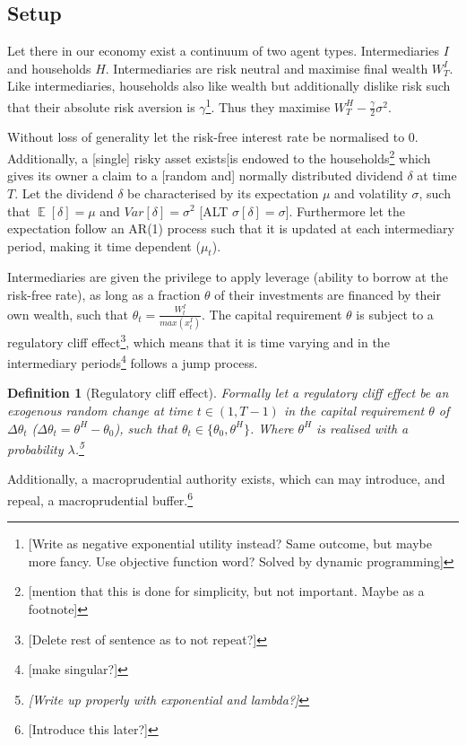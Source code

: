 \documentclass[11pt]{article}
\DeclareMathOperator{\E}{\mathbb{E}} %
\newtheorem{definition}{Definition}%
\begin{document}
\subsection*{Setup}

Let there in our economy exist a continuum of two agent types. Intermediaries $I$ and households $H$. Intermediaries are risk neutral and maximise final wealth $W^I_T$. Like intermediaries, households also like wealth but additionally dislike risk such that their absolute risk aversion is $\gamma$\footnote{[Write as negative exponential utility instead? Same outcome, but maybe more fancy. Use objective function word? Solved by dynamic programming]}. Thus they maximise $W^H_T - \frac{\gamma}{2}\sigma^2$.

Without loss of generality let the risk-free interest rate be normalised to 0. Additionally, a [single] risky asset exists[is endowed to the households\footnote{[mention that this is done for simplicity, but not important. Maybe as a footnote]} which gives its owner a claim to a [random and] normally distributed dividend $\delta$ at time $T$. Let the dividend $\delta$ be characterised by its expectation $\mu$ and volatility $\sigma$, such that $\E[\delta] = \mu$ and $Var[\delta] = \sigma^2$ [ALT $\sigma[\delta] = \sigma$]. Furthermore let the expectation follow an AR(1) process such that it is updated at each intermediary period, making it time dependent ($\mu_t$).

Intermediaries are given the privilege to apply leverage (ability to borrow at the risk-free rate), as long as a fraction $\theta$ of their investments are financed by their own wealth, such that $\theta_t = \frac{W^I_t}{max(x^{I}_t)}$. The capital requirement $\theta$ is subject to a regulatory cliff effect\footnote{[Delete rest of sentence as to not repeat?]}, which means that it is time varying and in the intermediary periods\footnote{[make singular?]} follows a jump process. 

\begin{definition}[Regulatory cliff effect] Formally let a regulatory cliff effect be an exogenous random change at time $t \in (1,T-1)$ in the capital requirement $\theta$ of $\Delta \theta_t$ ($\Delta \theta_t =  \theta^H-\theta_0$), such that $\theta_t \in \{\theta_0,\theta^H\}$. Where $\theta^H$ is realised with a probability $\lambda$.\footnote{[Write up properly with exponential and lambda?]}
\end{definition}

Additionally, a macroprudential authority exists, which can may introduce, and repeal, a macroprudential buffer.\footnote{[Introduce this later?]}
\end{document}
